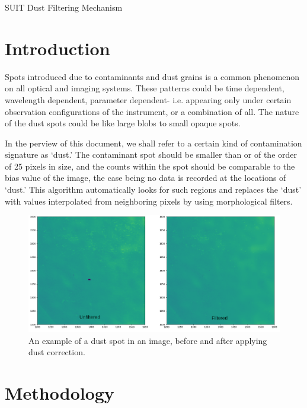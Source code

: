 \documentclass[11pt,a4paper]{article}
\begin{document}
	SUIT Dust Filtering Mechanism
	\section{Introduction}
	Spots introduced due to contaminants and dust grains is a common phenomenon on all optical and imaging systems. These patterns could be time dependent, wavelength dependent, parameter dependent- i.e. appearing only under certain observation configurations of the instrument, or a combination of all. The nature of the dust spots could be like large blobs to small opaque spots. 
	
	In the perview of  this document, we shall refer to a certain kind of contamination signature as `dust.' The contaminant spot should be smaller than or of the order of 25 pixels in size, and the counts within the spot should be comparable to the bias value of the image, the case being no data is recorded at the locations of `dust.' This algorithm automatically looks for such regions and replaces the `dust' with values interpolated from neighboring pixels by using morphological filters.
	
	\begin{figure}
		\centering
		\includegraphics[width=0.7\linewidth]{pics/dust_example}
		\caption{An example of a dust spot in an image, before and after applying dust correction.}
		\label{fig:dustexample}
	\end{figure}
	
	\section{Methodology}
\end{document}
